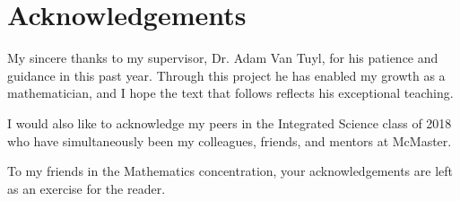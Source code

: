 


\begingroup

\let\clearpage\relax
\let\cleardoublepage\relax
\let\cleardoublepage\relax

\chapter*{Acknowledgements}


My sincere thanks to my supervisor, Dr. Adam Van Tuyl, for his patience and guidance in this past year. Through this project he has enabled my growth as a mathematician, and I hope the text that follows reflects his exceptional teaching.

\bigskip
\noindent
I would also like to acknowledge my peers in the Integrated Science class of 2018 who have simultaneously been my colleagues, friends, and mentors at McMaster.

\bigskip
\noindent
To my friends in the Mathematics concentration, your acknowledgements are left as an exercise for the reader.
\endgroup
